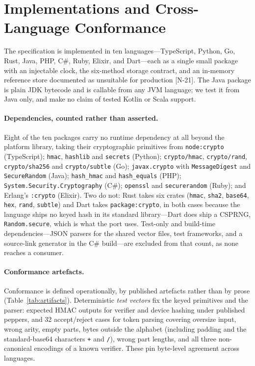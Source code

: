\documentclass[11pt]{article}
\begin{document}
\section{Implementations and Cross-Language Conformance}
\label{sec:conformance}

The specification is implemented in ten languages---TypeScript, Python, Go,
Rust, Java, PHP, C\#, Ruby, Elixir, and Dart---each as a single small package
with an injectable clock, the six-method storage contract, and an in-memory
reference store documented as unsuitable for production [N-21]. The Java
package is plain JDK bytecode and is callable from any JVM language; we test
it from Java only, and make no claim of tested Kotlin or Scala support.

\paragraph{Dependencies, counted rather than asserted.} Eight of the ten
packages carry no runtime dependency at all beyond the platform library,
taking their cryptographic primitives from
\texttt{node:crypto} (TypeScript); \texttt{hmac}, \texttt{hashlib} and
\texttt{secrets} (Python); \texttt{crypto/hmac}, \texttt{crypto/rand},
\texttt{crypto/sha256} and \texttt{crypto/subtle} (Go);
\texttt{javax.crypto} with \texttt{MessageDigest} and
\texttt{SecureRandom} (Java); \texttt{hash\_hmac} and
\texttt{hash\_equals} (PHP);
\texttt{System.Security.Cryptography} (C\#); \texttt{openssl} and
\texttt{securerandom} (Ruby); and Erlang's \texttt{:crypto} (Elixir). Two do
not: Rust takes six crates (\texttt{hmac}, \texttt{sha2}, \texttt{base64},
\texttt{hex}, \texttt{rand}, \texttt{subtle}) and Dart takes
\texttt{package:crypto}, in both cases because the language ships no keyed
hash in its standard library---Dart does ship a CSPRNG, \texttt{Random.secure},
which is what the port uses. Test-only and build-time
dependencies---JSON parsers for the shared vector files, test frameworks, and
a source-link generator in the C\# build---are excluded from that count, as
none reaches a consumer.

\paragraph{Conformance artefacts.} Conformance is defined operationally, by
published artefacts rather than by prose (Table~\ref{tab:artifacts}).
Deterministic \emph{test vectors} fix the keyed primitives and the parser:
expected HMAC outputs for verifier and device hashing under published
peppers, and 32 accept/reject cases for token parsing covering oversize
input, wrong arity, empty parts, bytes outside the alphabet (including
padding and the standard-base64 characters \texttt{+} and \texttt{/}), wrong
part lengths, and all three non-canonical encodings of a known verifier.
These pin byte-level agreement across languages.
\end{document}
